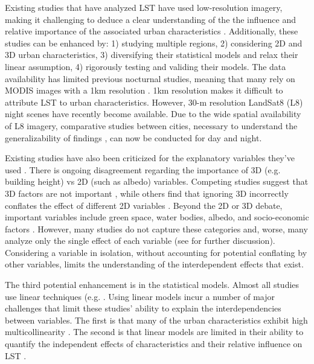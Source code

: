 \documentclass[final,3p,times,twocolumn,sort&compress]{elsarticle}
\begin{document}
Existing studies that have analyzed LST have used low-resolution imagery, making it challenging to deduce a clear understanding of the the influence and relative importance of the associated urban characteristics \cite{Chun2017-mm, Echevarria_Icaza2016-fr, Wicki2017-fv, Zhou2014-wc}. 
Additionally, these studies can be enhanced by: 1) studying multiple regions, 2) considering 2D and 3D urban characteristics, 3) diversifying their statistical models and relax their linear assumption, 4) rigorously testing and validing their models.
The data availability has limited previous nocturnal studies, meaning that many rely on MODIS images with a 1km resolution \cite{Zhou2014-wc, Echevarria_Icaza2016-fr,Wang2019-tree,Peng2012-iy}.
1km resolution makes it difficult to attribute LST to urban characteristics.
However, 30-m resolution LandSat8 (L8) night scenes have recently become available. 
Due to the wide spatial availability of L8 imagery, comparative studies between cities, necessary to understand the generalizability of findings \cite{Peng2012-iy, Hung2006-qy}, can now be conducted for day and night.

Existing studies have also been criticized for the explanatory variables they've used \cite{Chun2017-mm,Peng2018-cp}.
There is ongoing disagreement regarding the importance of 3D (e.g. building height) vs 2D (such as albedo) variables.  
Competing studies suggest that 3D factors are not important \cite{Berger2017-lx}, while others find that ignoring 3D incorrectly conflates the effect of different 2D variables \cite{Chun2017-mm}.
Beyond the 2D or 3D debate, important variables include green space, water bodies, albedo, and socio-economic factors \cite{Peng2018-cp}. 
However, many studies do not capture these categories and, worse, many analyze only the single effect of each variable \cite{Zhao2017-cc, Merbitz2012-xz, Unger2004-ry} (see \cite{Peng2018-cp, Chun2017-mm} for further discussion). 
Considering a variable in isolation, without accounting for potential conflating by other variables, limits the understanding of the interdependent effects that exist.

The third potential enhancement is in the statistical models.
Almost all studies use linear techniques (e.g. \cite{Li2017-yl, Peng2012-iy, Wicki2017-fv,Zhou2014-wc,Peng2018-cp,Echevarria_Icaza2016-fr,Chun2017-mm,Chun2018-so,Wang2019-tree,Wang2019-water}.
Using linear models incur a number of major challenges that limit these studies' ability to explain the interdependencies between variables. 
The first is that many of the urban characteristics exhibit high multicollinearity \cite{Zhou2014-wc}.
The second is that linear models are limited in their ability to quantify the independent effects of characteristics and their relative influence on LST \cite{Peng2018-cp, Zhou2014-wc}.
\end{document}
